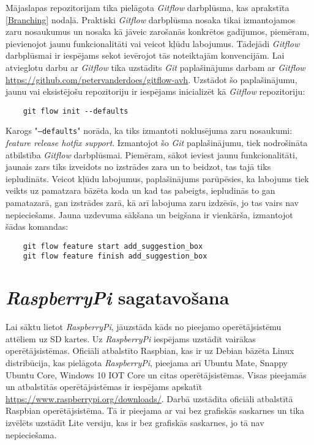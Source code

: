 Mājaslapas repozitorijam tika pielāgota \textit{Gitflow} darbplūsma, kas aprakstīta \ref{Branching} nodaļā. Praktiski \textit{Gitflow} darbplūsma nosaka tikai izmantojamos zaru nosaukumus un nosaka kā jāveic zarošanās konkrētos gadījumos, piemēram, pievienojot jaunu funkcionalitāti vai veicot kļūdu labojumus. Tādejādi \textit{Gitflow} darbplūsmai ir iespējams sekot ievērojot tās noteiktajām konvencijām. Lai atvieglotu darbu ar \textit{Gitflow} tika uzstādīts \textit{Git} paplašinājums darbam ar \textit{Gitflow} \url{https://github.com/petervanderdoes/gitflow-avh}. Uzstādot šo paplašinājumu, jaunu vai eksistējošu repozitoriju ir iespējams inicializēt kā \textit{Gitflow} repozitoriju:
\begin{lstlisting}
	git flow init --defaults
\end{lstlisting}
Karogs "\texttt{--defaults}" norāda, ka tiks izmantoti noklusējuma zaru nosaukumi: \textit{feature release hotfix support}. Izmantojot šo \textit{Git} paplašinājumu, tiek nodrošināta atbilstība \textit{Gitflow} darbplūsmai. Piemēram, sākot ieviest jaunu funkcionalitāti, jaunais zars tiks izveidots no izstrādes zara un to beidzot, tas tajā tiks iepludināts. Veicot kļūdu labojumus, paplašinājums parūpēsies, ka labojums tiek veikts uz pamatzara bāzēta koda un kad tas pabeigts, iepludinās to gan pamatazarā, gan izstrādes zarā, kā arī labojuma zaru izdzēsīs, jo tas vairs nav nepieciešams. Jauna uzdevuma sākšana un beigšana ir vienkārša, izmantojot šādas komandas:
\begin{lstlisting}
	git flow feature start add_suggestion_box
	git flow feature finish add_suggestion_box
\end{lstlisting}

\section{\textit{RaspberryPi} sagatavošana}
Lai sāktu lietot \textit{RaspberryPi}, jāuzstāda kāds no pieejamo operētājsistēmu attēliem uz SD kartes. Uz \textit{RaspberryPi} iespējams uzstādīt vairākas operētājsistēmas. Oficiāli atbalstīto Raspbian, kas ir uz Debian bāzēta Linux distribūcija, kas pielāgota \textit{RaspberryPi}, pieejama arī Ubuntu Mate, Snappy Ubuntu Core, Windows 10 IOT Core un citas operētājsistēmas. Visas pieejamās un atbalstītās operētājsistēmas ir iespējams apskatīt \url{https://www.raspberrypi.org/downloads/}.
Darbā uzstādīta oficiāli atbalstītā Raspbian operētājsistēma. Tā ir pieejama ar vai bez grafiskās saskarnes un tika izvēlēts uzstādīt Lite versiju, kas ir bez grafiskās saskarnes, jo tā nav nepieciešama.

